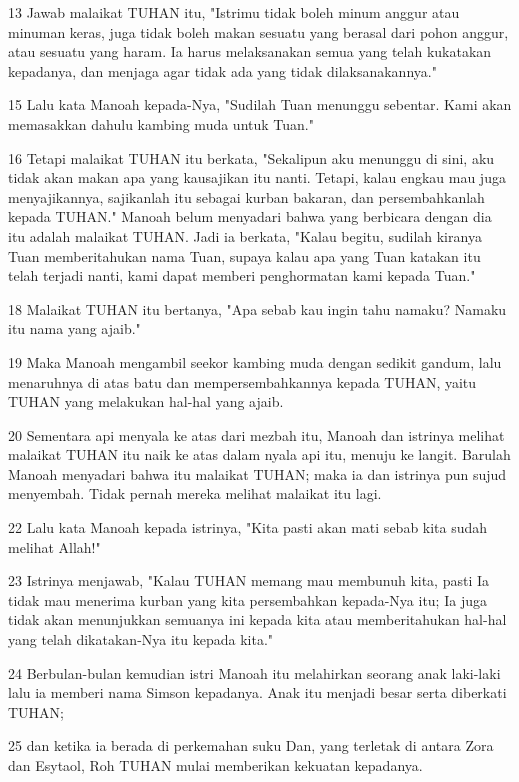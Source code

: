 \par 13 Jawab malaikat TUHAN itu, "Istrimu tidak boleh minum anggur atau minuman keras, juga tidak boleh makan sesuatu yang berasal dari pohon anggur, atau sesuatu yang haram. Ia harus melaksanakan semua yang telah kukatakan kepadanya, dan menjaga agar tidak ada yang tidak dilaksanakannya."
\par 15 Lalu kata Manoah kepada-Nya, "Sudilah Tuan menunggu sebentar. Kami akan memasakkan dahulu kambing muda untuk Tuan."
\par 16 Tetapi malaikat TUHAN itu berkata, "Sekalipun aku menunggu di sini, aku tidak akan makan apa yang kausajikan itu nanti. Tetapi, kalau engkau mau juga menyajikannya, sajikanlah itu sebagai kurban bakaran, dan persembahkanlah kepada TUHAN." Manoah belum menyadari bahwa yang berbicara dengan dia itu adalah malaikat TUHAN. Jadi ia berkata, "Kalau begitu, sudilah kiranya Tuan memberitahukan nama Tuan, supaya kalau apa yang Tuan katakan itu telah terjadi nanti, kami dapat memberi penghormatan kami kepada Tuan."
\par 18 Malaikat TUHAN itu bertanya, "Apa sebab kau ingin tahu namaku? Namaku itu nama yang ajaib."
\par 19 Maka Manoah mengambil seekor kambing muda dengan sedikit gandum, lalu menaruhnya di atas batu dan mempersembahkannya kepada TUHAN, yaitu TUHAN yang melakukan hal-hal yang ajaib.
\par 20 Sementara api menyala ke atas dari mezbah itu, Manoah dan istrinya melihat malaikat TUHAN itu naik ke atas dalam nyala api itu, menuju ke langit. Barulah Manoah menyadari bahwa itu malaikat TUHAN; maka ia dan istrinya pun sujud menyembah. Tidak pernah mereka melihat malaikat itu lagi.
\par 22 Lalu kata Manoah kepada istrinya, "Kita pasti akan mati sebab kita sudah melihat Allah!"
\par 23 Istrinya menjawab, "Kalau TUHAN memang mau membunuh kita, pasti Ia tidak mau menerima kurban yang kita persembahkan kepada-Nya itu; Ia juga tidak akan menunjukkan semuanya ini kepada kita atau memberitahukan hal-hal yang telah dikatakan-Nya itu kepada kita."
\par 24 Berbulan-bulan kemudian istri Manoah itu melahirkan seorang anak laki-laki lalu ia memberi nama Simson kepadanya. Anak itu menjadi besar serta diberkati TUHAN;
\par 25 dan ketika ia berada di perkemahan suku Dan, yang terletak di antara Zora dan Esytaol, Roh TUHAN mulai memberikan kekuatan kepadanya.

